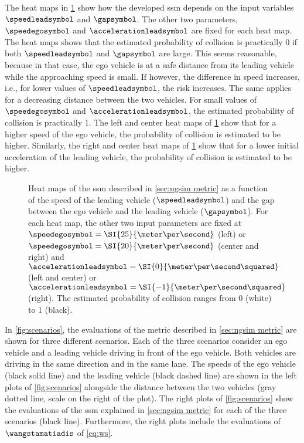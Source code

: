 The heat maps in \cref{fig:heatmaps} show how the developed \ac{ssm} depends on the input variables $\speedleadsymbol$ and $\gapsymbol$. 
The other two parameters, $\speedegosymbol$ and $\accelerationleadsymbol$ are fixed for each heat map.
The heat maps shows that the estimated probability of collision is practically 0 if both $\speedleadsymbol$ and $\gapsymbol$ are large.
This seems reasonable, because in that case, the ego vehicle is at a safe distance from its leading vehicle while the approaching speed is small. 
If however, the difference in speed increases, i.e., for lower values of $\speedleadsymbol$, the risk increases. 
The same applies for a decreasing distance between the two vehicles.
For small values of $\speedegosymbol$ and $\accelerationleadsymbol$, the estimated probability of collision is practically 1.
The left and center heat maps of \cref{fig:heatmaps} show that for a higher speed of the ego vehicle, the probability of collision is estimated to be higher.
Similarly, the right and center heat maps of \cref{fig:heatmaps} show that for a lower initial acceleration of the leading vehicle, the probability of collision is estimated to be higher.

\setlength{\figurewidth}{.35\linewidth}
\setlength{\figureheight}{0.8\figurewidth}
\begin{figure}
	\centering
	
	\caption{Heat maps of the \ac{ssm} described in \cref{sec:ngsim metric} as a function of the speed of the leading vehicle ($\speedleadsymbol$) and the gap between the ego vehicle and the leading vehicle ($\gapsymbol$).
		For each heat map, the other two input parameters are fixed at $\speedegosymbol=\SI{25}{\meter\per\second}$ (left) or $\speedegosymbol=\SI{20}{\meter\per\second}$ (center and right) and $\accelerationleadsymbol=\SI{0}{\meter\per\second\squared}$ (left and center) or $\accelerationleadsymbol=\SI{-1}{\meter\per\second\squared}$ (right).
		The estimated probability of collision ranges from 0 (white) to 1 (black).}
	\label{fig:heatmaps}
\end{figure}

In \cref{fig:scenarios}, the evaluations of the metric described in \cref{sec:ngsim metric} are shown for three different scenarios. 
Each of the three scenarios consider an ego vehicle and a leading vehicle driving in front of the ego vehicle.
Both vehicles are driving in the same direction and in the same lane. 
The speeds of the ego vehicle (black solid line) and the leading vehicle (black dashed line) are shown in the left plots of \cref{fig:scenarios} alongside the distance between the two vehicles (gray dotted line, scale on the right of the plot).
The right plots of \cref{fig:scenarios} show the evaluations of the \ac{ssm} explained in \cref{sec:ngsim metric} for each of the three scenarios (black line).
Furthermore, the right plots include the evaluations of $\wangstamatiadis$ of \cref{eq:ws}.

